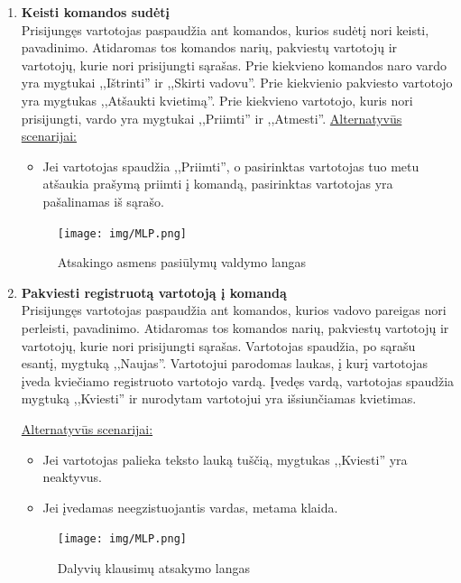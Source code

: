 \documentclass{VUMIFPSkursinis}
\begin{document}
\begin{enumerate} [label = \textbf{U\arabic*.}]
			\item \textbf{Keisti komandos sudėtį} \\
				Prisijungęs vartotojas paspaudžia ant komandos, kurios sudėtį nori keisti, pavadinimo. Atidaromas tos komandos narių, pakviestų vartotojų ir vartotojų, kurie nori prisijungti sąrašas. Prie kiekvieno komandos naro vardo yra mygtukai ,,Ištrinti'' ir ,,Skirti vadovu''. Prie kiekvienio pakviesto vartotojo yra mygtukas ,,Atšaukti kvietimą''. Prie kiekvieno vartotojo, kuris nori prisijungti, vardo yra mygtukai ,,Priimti'' ir ,,Atmesti''. 
				\underline{Alternatyvūs scenarijai:}
				\begin{itemize}
					\item Jei vartotojas spaudžia ,,Priimti'', o pasirinktas vartotojas tuo metu atšaukia prašymą priimti į komandą, pasirinktas vartotojas yra pašalinamas iš sąrašo.
				\end{itemize}
				
				\begin{figure}[H]
					\centering
					\texttt{[image: img/MLP.png]}
					\caption{Atsakingo asmens pasiūlymų valdymo langas}
					\label{fig:pasiulymu-sarasas}
				\end{figure}
				
			\item \textbf{Pakviesti registruotą vartotoją į komandą}   \\
					Prisijungęs vartotojas paspaudžia ant komandos, kurios vadovo pareigas nori perleisti, pavadinimo. Atidaromas tos komandos narių, pakviestų vartotojų ir vartotojų, kurie nori prisijungti sąrašas.  
					Vartotojas spaudžia, po sąrašu esantį, mygtuką ,,Naujas''. Vartotojui parodomas laukas, į kurį vartotojas įveda kviečiamo registruoto vartotojo vardą. Įvedęs vardą, vartotojas spaudžia mygtuką ,,Kviesti'' ir nurodytam vartotojui yra išsiunčiamas kvietimas.
					
					\underline{Alternatyvūs scenarijai:}
					\begin{itemize}
						\item Jei vartotojas palieka teksto lauką tuščią, mygtukas ,,Kviesti'' yra neaktyvus.
						\item Jei įvedamas neegzistuojantis vardas, metama klaida.
					\end{itemize}
				
				\begin{figure}[H]
					\centering
					\texttt{[image: img/MLP.png]}
					\caption{Dalyvių klausimų atsakymo langas}
					\label{fig:atsakyti-klausimus}
				\end{figure}
				

\end{enumerate}
\end{document}
